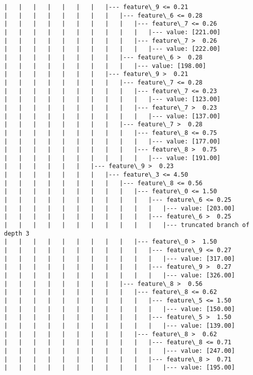 \documentclass[11pt]{article}
\begin{document}
\begin{Verbatim}[commandchars=\\\{\}]
|   |   |   |   |   |   |   |--- feature\_9 <= 0.21
|   |   |   |   |   |   |   |   |--- feature\_6 <= 0.28
|   |   |   |   |   |   |   |   |   |--- feature\_7 <= 0.26
|   |   |   |   |   |   |   |   |   |   |--- value: [221.00]
|   |   |   |   |   |   |   |   |   |--- feature\_7 >  0.26
|   |   |   |   |   |   |   |   |   |   |--- value: [222.00]
|   |   |   |   |   |   |   |   |--- feature\_6 >  0.28
|   |   |   |   |   |   |   |   |   |--- value: [198.00]
|   |   |   |   |   |   |   |--- feature\_9 >  0.21
|   |   |   |   |   |   |   |   |--- feature\_7 <= 0.28
|   |   |   |   |   |   |   |   |   |--- feature\_7 <= 0.23
|   |   |   |   |   |   |   |   |   |   |--- value: [123.00]
|   |   |   |   |   |   |   |   |   |--- feature\_7 >  0.23
|   |   |   |   |   |   |   |   |   |   |--- value: [137.00]
|   |   |   |   |   |   |   |   |--- feature\_7 >  0.28
|   |   |   |   |   |   |   |   |   |--- feature\_8 <= 0.75
|   |   |   |   |   |   |   |   |   |   |--- value: [177.00]
|   |   |   |   |   |   |   |   |   |--- feature\_8 >  0.75
|   |   |   |   |   |   |   |   |   |   |--- value: [191.00]
|   |   |   |   |   |   |--- feature\_9 >  0.23
|   |   |   |   |   |   |   |--- feature\_3 <= 4.50
|   |   |   |   |   |   |   |   |--- feature\_8 <= 0.56
|   |   |   |   |   |   |   |   |   |--- feature\_0 <= 1.50
|   |   |   |   |   |   |   |   |   |   |--- feature\_6 <= 0.25
|   |   |   |   |   |   |   |   |   |   |   |--- value: [203.00]
|   |   |   |   |   |   |   |   |   |   |--- feature\_6 >  0.25
|   |   |   |   |   |   |   |   |   |   |   |--- truncated branch of depth 3
|   |   |   |   |   |   |   |   |   |--- feature\_0 >  1.50
|   |   |   |   |   |   |   |   |   |   |--- feature\_9 <= 0.27
|   |   |   |   |   |   |   |   |   |   |   |--- value: [317.00]
|   |   |   |   |   |   |   |   |   |   |--- feature\_9 >  0.27
|   |   |   |   |   |   |   |   |   |   |   |--- value: [326.00]
|   |   |   |   |   |   |   |   |--- feature\_8 >  0.56
|   |   |   |   |   |   |   |   |   |--- feature\_8 <= 0.62
|   |   |   |   |   |   |   |   |   |   |--- feature\_5 <= 1.50
|   |   |   |   |   |   |   |   |   |   |   |--- value: [150.00]
|   |   |   |   |   |   |   |   |   |   |--- feature\_5 >  1.50
|   |   |   |   |   |   |   |   |   |   |   |--- value: [139.00]
|   |   |   |   |   |   |   |   |   |--- feature\_8 >  0.62
|   |   |   |   |   |   |   |   |   |   |--- feature\_8 <= 0.71
|   |   |   |   |   |   |   |   |   |   |   |--- value: [247.00]
|   |   |   |   |   |   |   |   |   |   |--- feature\_8 >  0.71
|   |   |   |   |   |   |   |   |   |   |   |--- value: [195.00]

\end{Verbatim}
\end{document}
